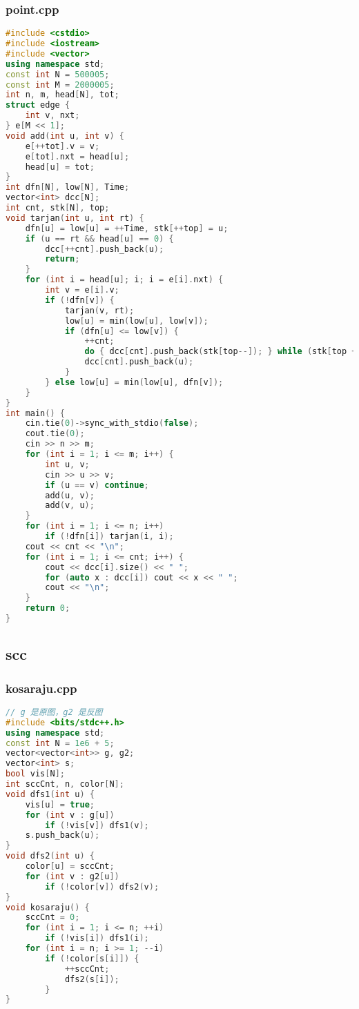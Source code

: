 \documentclass[9pt, a4paper, oneside]{book}
\begin{document}
\subsubsection{point.cpp}
\begin{lstlisting}[language={C++}]
#include <cstdio>
#include <iostream>
#include <vector>
using namespace std;
const int N = 500005;
const int M = 2000005;
int n, m, head[N], tot;
struct edge {
    int v, nxt;
} e[M << 1];
void add(int u, int v) {
    e[++tot].v = v;
    e[tot].nxt = head[u];
    head[u] = tot;
}
int dfn[N], low[N], Time;
vector<int> dcc[N];
int cnt, stk[N], top;
void tarjan(int u, int rt) {
    dfn[u] = low[u] = ++Time, stk[++top] = u;
    if (u == rt && head[u] == 0) {
        dcc[++cnt].push_back(u);
        return;
    }
    for (int i = head[u]; i; i = e[i].nxt) {
        int v = e[i].v;
        if (!dfn[v]) {
            tarjan(v, rt);
            low[u] = min(low[u], low[v]);
            if (dfn[u] <= low[v]) {
                ++cnt;
                do { dcc[cnt].push_back(stk[top--]); } while (stk[top + 1] != v);
                dcc[cnt].push_back(u);
            }
        } else low[u] = min(low[u], dfn[v]);
    }
}
int main() {
    cin.tie(0)->sync_with_stdio(false);
    cout.tie(0);
    cin >> n >> m;
    for (int i = 1; i <= m; i++) {
        int u, v;
        cin >> u >> v;
        if (u == v) continue;
        add(u, v);
        add(v, u);
    }
    for (int i = 1; i <= n; i++)
        if (!dfn[i]) tarjan(i, i);
    cout << cnt << "\n";
    for (int i = 1; i <= cnt; i++) {
        cout << dcc[i].size() << " ";
        for (auto x : dcc[i]) cout << x << " ";
        cout << "\n";
    }
    return 0;
}\end{lstlisting}
\subsection{scc}
\subsubsection{kosaraju.cpp}
\begin{lstlisting}[language={C++}]
// g 是原图，g2 是反图
#include <bits/stdc++.h>
using namespace std;
const int N = 1e6 + 5;
vector<vector<int>> g, g2;
vector<int> s;
bool vis[N];
int sccCnt, n, color[N];
void dfs1(int u) {
    vis[u] = true;
    for (int v : g[u])
        if (!vis[v]) dfs1(v);
    s.push_back(u);
}
void dfs2(int u) {
    color[u] = sccCnt;
    for (int v : g2[u])
        if (!color[v]) dfs2(v);
}
void kosaraju() {
    sccCnt = 0;
    for (int i = 1; i <= n; ++i)
        if (!vis[i]) dfs1(i);
    for (int i = n; i >= 1; --i)
        if (!color[s[i]]) {
            ++sccCnt;
            dfs2(s[i]);
        }
}\end{lstlisting}
\end{document}
